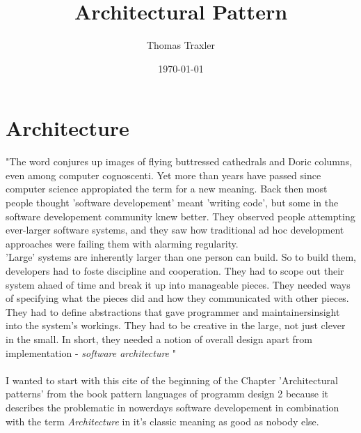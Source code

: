 \documentclass[a4paper,12pt]{scrreprt}
\begin{document}
\author{Thomas Traxler} %
\title{ Architectural Pattern } %
\date{\today} %

\maketitle
\tableofcontents


\chapter{Architecture}
{"}The word conjures up images of flying buttressed cathedrals and Doric columns, even among computer cognoscenti. Yet more than years have passed since computer science appropiated the term for a new meaning. Back then most people thought 'software developement' meant 'writing code', but some in the software developement community knew better. They observed people attempting ever-larger software systems, and they saw how traditional ad hoc development approaches were failing them with alarming regularity. \\ 'Large' systems are inherently larger than one person can build. So to build them, developers had to foste discipline and cooperation. They had to scope out their system ahaed of time and break it up into manageable pieces. They needed ways of specifying what the pieces did and how they communicated with other pieces. They had to define abstractions that gave programmer and maintainersinsight into the system's workings. They had to be creative in the large, not just clever in the small. In short, they needed a notion of overall design apart from implementation - \textit{software architecture} {"}\cite{Lavender1996}\\\\
I wanted to start with this cite of the beginning of the Chapter 'Architectural patterns' from the book pattern languages of programm design 2 because it describes the problematic in nowerdays software developement in combination with the term \textit{Architecture} in it's classic meaning as good as nobody else.  



%

\end{document}
